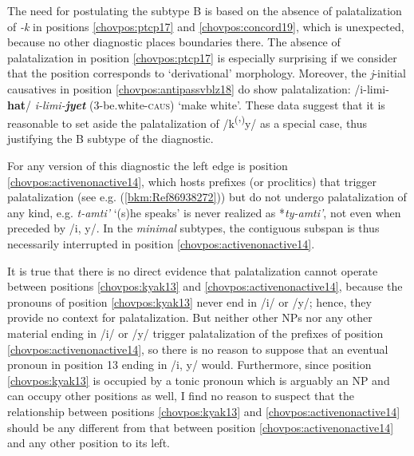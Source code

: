 \documentclass[output=paper]{langscibook}
\begin{document}
\newpage
The need for postulating the subtype B is based on the absence of palatalization of \textit{-k} in positions \ref{chovpos:ptcp17} and \ref{chovpos:concord19}, which is unexpected, because no other diagnostic places boundaries there. The absence of palatalization in position \ref{chovpos:ptcp17} is especially surprising if we consider that the position corresponds to `derivational' morphology. Moreover, the \textit{j}{}-initial causatives in position \ref{chovpos:antipassvblz18} do show palatalization: /i-limi-\textbf{hat}/ \MVRightarrow{} \textit{i-limi-}\textbf{\textit{jyet}} (3-be.white-\textsc{caus}) `make white'. These data suggest that it is reasonable to set aside the palatalization of /k\textsuperscript{(}'\textsuperscript{)}y/ as a special case, thus justifying the B subtype of the diagnostic.

For any version of this diagnostic the left edge is position \ref{chovpos:activenonactive14}, which hosts prefixes (or proclitics) that trigger palatalization (see e.g. (\ref{bkm:Ref86938272})) but do not undergo palatalization of any kind, e.g. \textit{t-amti'} `(s)he speaks' is never realized  as *\textit{ty-amti'}, not even when preceded by /i, y/. In the \textit{minimal} subtypes, the contiguous subspan is thus necessarily interrupted in position \ref{chovpos:activenonactive14}. 

It is true that there is no direct evidence that palatalization cannot operate between positions \ref{chovpos:kyak13} and \ref{chovpos:activenonactive14}, because the pronouns of position \ref{chovpos:kyak13} never end in /i/ or /y/; hence, they provide no context for palatalization. But neither other NPs nor any other material ending in /i/ or /y/ trigger palatalization of the prefixes of position \ref{chovpos:activenonactive14}, so there is no reason to suppose that an eventual pronoun in position 13 ending in /i, y/ would. Furthermore, since position \ref{chovpos:kyak13} is occupied by a tonic pronoun which is arguably an NP and can occupy other positions as well, I find no reason to suspect that the relationship between positions \ref{chovpos:kyak13} and \ref{chovpos:activenonactive14} should be any different from that between position \ref{chovpos:activenonactive14} and any other position to its left.
\end{document}
